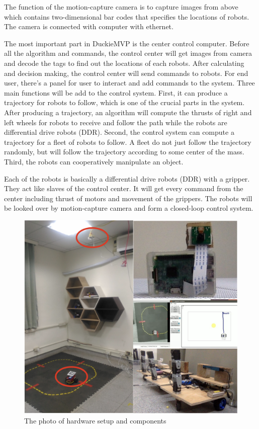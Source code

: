 \documentclass[letterpaper, 10 pt, conference]{ieeeconf}  %
\begin{document}
The function of the motion-capture camera is to capture images from above which contains two-dimensional bar codes that specifies the locations of robots.  The camera is connected with computer with ethernet.

The most important part in DuckieMVP is the center control computer. Before all the algorithm and commands, the control center will get images from camera and decode the tags to find out the locations of each robots. After calculating and decision making, the control center will send commands to robots. For end user, there's a panel for user to interact and add commands to the system. Three main functions will be add to the control system. First, it can produce a trajectory for robots to follow, which is one of the crucial parts in the system. After producing a trajectory, an algorithm will compute the thrusts of right and left wheels for robots to receive and follow the path while the robots are differential drive robots (DDR). Second, the control system can compute a trajectory for a fleet of robots to follow. A fleet do not just follow the trajectory randomly, but will follow the trajectory according to some center of the mass. Third, the robots can cooperatively manipulate an object.

Each of the robots is basically a differential drive robots (DDR) with a gripper. They act like slaves of the control center. It will get every command from the center including thrust of motors and movement of the grippers. The robots will be looked over by motion-capture camera and form a closed-loop control system.
\begin{figure}[h] %
\includegraphics[width=1\columnwidth]{system_diagram_pic}
\centering
\caption{The photo of hardware setup and components}
 \label{figure:system_diagram_pic}
\end{figure}
\end{document}
